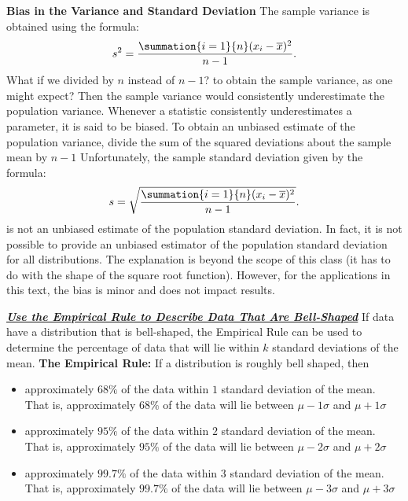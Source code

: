 \documentclass{report}
\begin{document}
        \bigbreak \noindent 
        \textbf{Bias in the Variance and Standard Deviation}
        \bigbreak \noindent 
        The sample variance is obtained using the formula:
        \begin{align*}
            s^{2} = \frac{\summation{i=1}{n}(x_{i} - \overline{x})^{2}}{n-1}
        .\end{align*}
        What if we divided by $n$ instead of $n-1 $?  to obtain the sample variance, as one might expect? Then the sample variance would consistently underestimate the population variance. Whenever a statistic consistently underestimates a parameter, it is said to be biased. To obtain an unbiased estimate of the population variance, divide the sum of the squared deviations about the sample mean by $n-1 $
        \bigbreak \noindent 
        Unfortunately, the sample standard deviation given by the formula:
        \begin{align*}
            s = \sqrt{\frac{\summation{i=1}{n}(x_{i} - \overline{x})^{2}}{n-1}}
        .\end{align*}
         is not an unbiased estimate of the population standard deviation. In fact, it is not possible to provide an unbiased estimator of the population standard deviation for all distributions. The explanation is beyond the scope of this class (it has to do with the shape of the square root function). However, for the applications in this text, the bias is minor and does not impact results.

         \pagebreak \bigbreak \noindent
         \textbf{\textit{\underline{Use the Empirical Rule to Describe Data That Are Bell-Shaped}}}
         \bigbreak \noindent 
         If data have a distribution that is bell-shaped, the Empirical Rule can be used to determine the percentage of data that will lie within $k $ standard deviations of the mean.
         \bigbreak \noindent 
         \textbf{The Empirical Rule:}
         \bigbreak \noindent 
         If a distribution is roughly bell shaped, then
         \begin{itemize}
             \item approximately $68\% $ of the data within $1 $ standard deviation of the mean. That is, approximately $68\% $  of the data will lie between $\mu-1 \sigma $ and $\mu + 1 \sigma $ 
             \item approximately $95\% $ of the data within $2 $ standard deviation of the mean. That is, approximately $95\% $  of the data will lie between $\mu-2 \sigma $ and $\mu + 2 \sigma $ 
             \item approximately $99.7\% $ of the data within $3 $ standard deviation of the mean. That is, approximately $99.7\% $  of the data will lie between $\mu-3 \sigma $ and $\mu + 3 \sigma $ 
         \end{itemize}
         \bigbreak \noindent 
         \pagebreak \bigbreak \noindent
\end{document}
